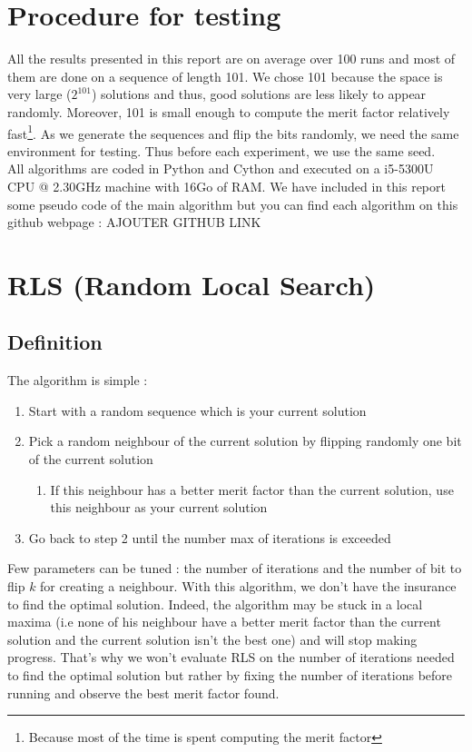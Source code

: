 \documentclass[a4paper,11pt,openany]{article}
\begin{document}
\section{Procedure for testing}
\noindent
All the results presented in this report are on average over 100 runs and most of them are done on a sequence of length 101. We chose 101 because the space is very large ($2^{101}$) solutions and thus, good solutions are less likely to appear randomly. Moreover, 101 is small enough to compute the merit factor relatively fast\footnote{Because most of the time is spent computing the merit factor}. As we generate the sequences and flip the bits randomly, we need the same environment for testing. Thus before each experiment, we use the same seed.\\
All algorithms are coded in Python and Cython and executed on a i5-5300U CPU @ 2.30GHz machine with 16Go of RAM. We have included in this report some pseudo code of the main algorithm but you can find each algorithm on this github webpage : AJOUTER GITHUB LINK
\section{RLS (Random Local Search)}
\subsection{Definition}
\noindent
The algorithm is simple \cite{rls}:
\begin{enumerate}
\item Start with a random sequence which is your current solution
\item Pick a random neighbour of the current solution by flipping randomly one bit of the current solution
\begin{enumerate}
\item If this neighbour has a better merit factor than the current solution, use this neighbour as your current solution
\end{enumerate}
\item Go back to step 2 until the number max of iterations is exceeded
\end{enumerate}
Few parameters can be tuned : the number of iterations and the number of bit to flip $k$ for creating a neighbour. With this algorithm, we don't have the insurance to find the optimal solution. Indeed, the algorithm may be stuck in a local maxima (i.e none of his neighbour have a better merit factor than the current solution and the current solution isn't the best one) and will stop making progress. That's why we won't evaluate RLS on the number of iterations needed to find the optimal solution but rather by fixing the number of iterations before running and observe the best merit factor found.
\end{document}
